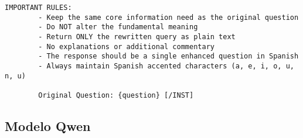 \begin{itemize}
\begin{lstlisting}[breaklines=true,basicstyle=\small\ttfamily]
        IMPORTANT RULES:
        - Keep the same core information need as the original question
        - Do NOT alter the fundamental meaning
        - Return ONLY the rewritten query as plain text
        - No explanations or additional commentary
        - The response should be a single enhanced question in Spanish
        - Always maintain Spanish accented characters (a, e, i, o, u, n, u)

        Original Question: {question} [/INST]
    \end{lstlisting}

\end{itemize}

\subsection{Modelo Qwen}
